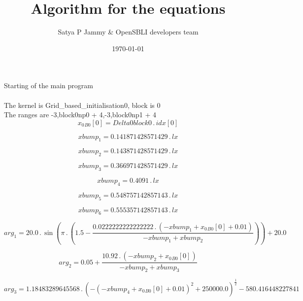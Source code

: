 \documentclass{article}
\title{Algorithm for the equations}
\author{Satya P Jammy \& OpenSBLI developers team}
\date{\today}
\begin{document}
\maketitle
\noindent Starting of the main program\\
\\\noindent The kernel is Grid_based_initialisation0, block is 0\\\noindent The ranges are -3,block0np0 + 4,-3,block0np1 + 4\\\begin{dmath}{x_{0}{_{B0}}}[{0}] = Delta0block0 \,.\, {idx}[{0}]\end{dmath}

\begin{dmath}xbump_{1} = 0.141871428571429 \,.\, lx\end{dmath}

\begin{dmath}xbump_{2} = 0.143871428571429 \,.\, lx\end{dmath}

\begin{dmath}xbump_{3} = 0.366971428571429 \,.\, lx\end{dmath}

\begin{dmath}xbump_{4} = 0.4091 \,.\, lx\end{dmath}

\begin{dmath}xbump_{5} = 0.548757142857143 \,.\, lx\end{dmath}

\begin{dmath}xbump_{6} = 0.555357142857143 \,.\, lx\end{dmath}

\begin{dmath}arg_{1} = 20.0 \,.\, \sin{\left (\pi \,.\, \left(1.5 - \frac{0.0222222222222222 \,.\, \left(- xbump_{1} + {x_{0}{_{B0}}}[{0}] + 0.01\right)}{- xbump_{1} + xbump_{2}}\right) \right )} + 20.0\end{dmath}

\begin{dmath}arg_{2} = 0.05 + \frac{10.92 \,.\, \left(- xbump_{2} + {x_{0}{_{B0}}}[{0}]\right)}{- xbump_{2} + xbump_{3}}\end{dmath}

\begin{dmath}arg_{3} = 1.18483289645568 \,.\, \left(- \left(- xbump_{4} + {x_{0}{_{B0}}}[{0}] + 0.01 \right)^{2} + 250000.0 \right)^{\frac{1}{2}} - 580.416448227841\end{dmath}
\end{document}
